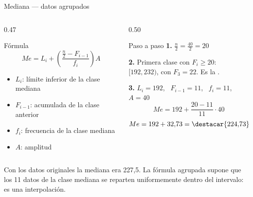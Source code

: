 \documentclass[aspectratio=169,10pt]{beamer}
\begin{document}
\begin{frame}{Mediana — datos agrupados}
  \scriptsize
  \begin{columns}[T,onlytextwidth]
    \begin{column}{0.47\textwidth}
      \begin{block}{Fórmula}
        \scriptsize
        \[ Me = L_i + \left(\frac{\frac{n}{2} - F_{i-1}}{f_i}\right) A \]
        \vspace{-0.15cm}
        \begin{itemize}\setlength{\itemsep}{-0.08cm}
          \item[] $L_i$: límite inferior de la clase mediana
          \item[] $F_{i-1}$: acumulada de la clase anterior
          \item[] $f_i$: frecuencia de la clase mediana
          \item[] $A$: amplitud
        \end{itemize}
      \end{block}
    \end{column}
    \begin{column}{0.50\textwidth}
      \begin{exampleblock}{Paso a paso}
        \scriptsize
        \textbf{1.} $\frac{n}{2} = \frac{40}{2} = 20$

        \textbf{2.} Primera clase con $F_i \ge 20$: \\
        $[192, 232)$, con $F_3 = 22$. Es la .

        \textbf{3.} $L_i=192$, \ $F_{i-1}=11$, \ $f_i=11$, \ $A=40$
        \[ Me = 192 + \frac{20-11}{11}\cdot 40 \]
        \[ Me = 192 + 32{,}73 = \destacar{224{,}73} \]
      \end{exampleblock}
    \end{column}
  \end{columns}

  \vspace{0.05cm}
  {\tiny\color{uniGris} Con los datos originales la mediana era 227,5. La
  fórmula agrupada supone que los 11 datos de la clase mediana se reparten
  uniformemente dentro del intervalo: es una interpolación.}
\end{frame}
\end{document}
